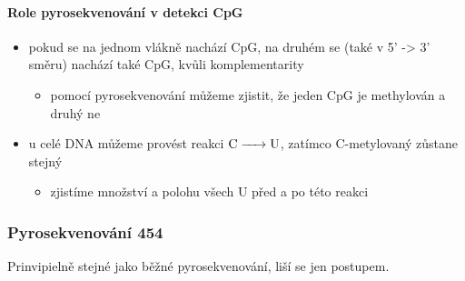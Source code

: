 \documentclass[DIV=8]{scrreprt}
\begin{document}
\paragraph{Role pyrosekvenování v detekci CpG}
\begin{itemize}[nosep]
    \item pokud se na jednom vlákně nachází CpG, na druhém se (také v 5' -> 3' směru) nachází také CpG, kvůli komplementarity
\begin{itemize}[nosep]
    \item pomocí pyrosekvenování můžeme zjistit, že jeden CpG je methylován a druhý ne
\end{itemize}

    \item u celé DNA můžeme provést reakci \(\ce{C -> U}\), zatímco C-metylovaný zůstane stejný
\begin{itemize}[nosep]
    \item zjistíme množství a polohu všech U před a po této reakci
\end{itemize}

\end{itemize}



\subsubsection{Pyrosekvenování 454} \label{Pyrosekvenování 454}


Prinvipielně stejné jako běžné pyrosekvenování, liší se jen postupem.
\end{document}
